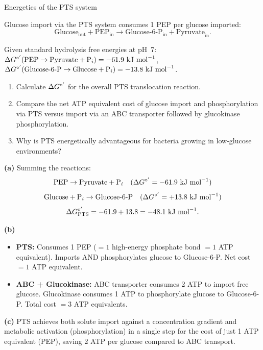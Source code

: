 \documentclass[12pt, a4paper, oneside]{report}
\begin{document}
\begin{problem}{\enspace{}\enspace
  Energetics of the PTS system}

  Glucose import via the PTS system consumes 1 PEP per glucose imported:
  \[
    \text{Glucose}_\text{out} + \text{PEP}_\text{in} \longrightarrow \text{Glucose-6-P}_\text{in} + \text{Pyruvate}_\text{in}.
  \]

  Given standard hydrolysis free energies at pH~7:
  $\Delta G^{\circ'}(\text{PEP} \to \text{Pyruvate} + \mathrm{P}_i) = -61.9~\text{kJ~mol}^{-1}$,
  $\Delta G^{\circ'}(\text{Glucose-6-P} \to \text{Glucose} + \mathrm{P}_i) = -13.8~\text{kJ~mol}^{-1}$.

  \begin{enumerate}
    \item Calculate $\Delta G^{\circ'}$ for the overall PTS translocation reaction.
    \item Compare the net ATP equivalent cost of glucose import and phosphorylation via PTS versus import via an ABC transporter followed by glucokinase phosphorylation.
    \item Why is PTS energetically advantageous for bacteria growing in low-glucose environments?
  \end{enumerate}
\end{problem}

\begin{solution}
  \textbf{(a)} Summing the reactions:
  \[
    \text{PEP} \to \text{Pyruvate} + \mathrm{P}_i \quad (\Delta G^{\circ'} = -61.9~\text{kJ~mol}^{-1})
  \]
  \[
    \text{Glucose} + \mathrm{P}_i \to \text{Glucose-6-P} \quad (\Delta G^{\circ'} = +13.8~\text{kJ~mol}^{-1})
  \]
  \[
    \Delta G^{\circ'}_{\text{PTS}} = -61.9 + 13.8 = -48.1~\text{kJ~mol}^{-1}.
  \]

  \textbf{(b)}
  \begin{itemize}
    \item \textbf{PTS:} Consumes 1 PEP ($= 1$ high-energy phosphate bond $= 1$ ATP equivalent). Imports AND phosphorylates glucose to Glucose-6-P. Net cost $= 1$ ATP equivalent.
    \item \textbf{ABC + Glucokinase:} ABC transporter consumes 2 ATP to import free glucose. Glucokinase consumes 1 ATP to phosphorylate glucose to Glucose-6-P. Total cost $= 3$ ATP equivalents.
  \end{itemize}

  \textbf{(c)} PTS achieves both solute import against a concentration gradient and metabolic activation (phosphorylation) in a single step for the cost of just 1 ATP equivalent (PEP), saving 2 ATP per glucose compared to ABC transport.
\end{solution}
\end{document}
